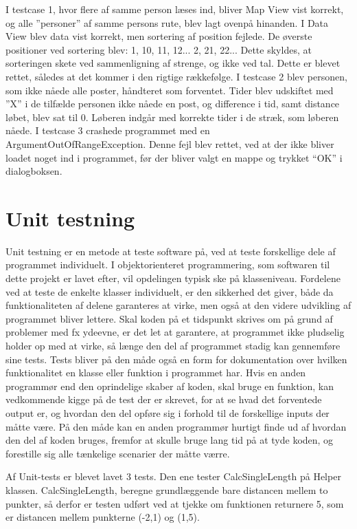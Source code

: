I testcase 1, hvor flere af samme person læses ind, bliver Map View vist korrekt, og alle ”personer” af samme persons rute, blev lagt ovenpå hinanden. I Data View blev data vist korrekt, men sortering af position fejlede. De øverste positioner ved sortering blev: 1, 10, 11, 12... 2, 21, 22... Dette skyldes, at sorteringen skete ved sammenligning af strenge, og ikke ved tal. Dette er blevet rettet, således at det kommer i den rigtige rækkefølge.\newline
I testcase 2 blev personen, som ikke nåede alle poster, håndteret som forventet. Tider blev udskiftet med ”X” i de tilfælde personen ikke nåede en post, og difference i tid, samt distance løbet, blev sat til 0. Løberen indgår med korrekte tider i de stræk, som løberen nåede.\newline
I testcase 3 crashede programmet med en ArgumentOutOfRangeException. Denne fejl blev rettet, ved at der ikke bliver loadet noget ind i programmet, før der bliver valgt en mappe og trykket “OK” i dialogboksen.

\section{Unit testning}
Unit testning er en metode at teste software på, ved at teste forskellige dele af programmet individuelt. I objektorienteret programmering, som softwaren til dette projekt er lavet efter, vil opdelingen typisk ske på klasseniveau. Fordelene ved at teste de enkelte klasser individuelt, er den sikkerhed det giver, både da funktionaliteten af delene garanteres at virke, men også at den videre udvikling af programmet bliver lettere. Skal koden på et tidspunkt skrives om på grund af problemer med fx ydeevne, er det let at garantere, at programmet ikke pludselig holder op med at virke, så længe den del af programmet stadig kan gennemføre sine tests.
Tests bliver på den måde også en form for dokumentation over hvilken funktionalitet en klasse eller funktion i programmet har. Hvis en anden programmør end den oprindelige skaber af koden, skal bruge en funktion, kan vedkommende kigge på de test der er skrevet, for at se hvad det forventede output er, og hvordan den del opføre sig i forhold til de forskellige inputs der måtte være. På den måde kan en anden programmør hurtigt finde ud af hvordan den del af koden bruges, fremfor at skulle bruge lang tid på at tyde koden, og forestille sig alle tænkelige scenarier der måtte værre. 

Af Unit-tests er blevet lavet 3 tests. 
Den ene tester CalcSingleLength på Helper klassen. CalcSingleLength, beregne grundlæggende bare distancen mellem to punkter, så derfor er testen udført ved at tjekke om funktionen returnere 5, som er distancen mellem punkterne (-2,1) og (1,5).

